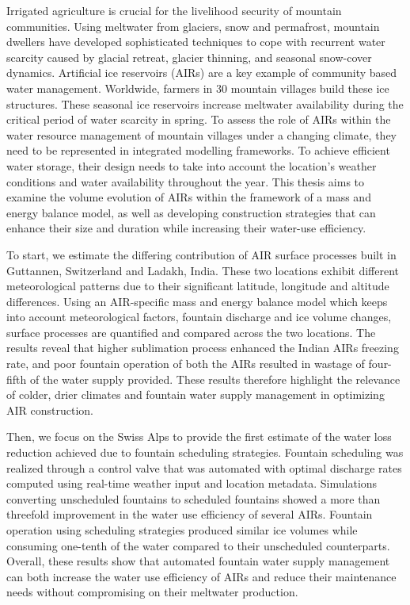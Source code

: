 %
\label{sec:abstract}

Irrigated agriculture is crucial for the livelihood security of mountain communities. Using meltwater from
glaciers, snow and permafrost, mountain dwellers have developed sophisticated techniques to cope with recurrent
water scarcity caused by glacial retreat, glacier thinning, and seasonal snow-cover dynamics. Artificial ice
reservoirs (AIRs) are a key example of community based water management. Worldwide, farmers in 30 mountain
villages build these ice structures. These seasonal ice reservoirs increase meltwater availability during the
critical period of water scarcity in spring. To assess the role of AIRs within the water resource management of
mountain villages under a changing climate, they need to be represented in integrated modelling frameworks. To
achieve efficient water storage, their design needs to take into account the location's weather conditions and
water availability throughout the year. This thesis aims to examine the volume evolution of AIRs within the
framework of a mass and energy balance model, as well as developing construction strategies that can enhance
their size and duration while increasing their water-use efficiency. 

To start, we estimate the differing contribution of AIR surface processes built in Guttannen, Switzerland and
Ladakh, India. These two locations exhibit different meteorological patterns due to their significant latitude,
longitude and altitude differences. Using an AIR-specific mass and energy balance model which keeps into account
meteorological factors, fountain discharge and ice volume changes, surface processes are quantified and compared
across the two locations. The results reveal that higher sublimation process enhanced the Indian AIRs freezing
rate, and poor fountain operation of both the AIRs resulted in wastage of four-fifth of the water supply
provided. These results therefore highlight the relevance of colder, drier climates and fountain water supply
management in optimizing AIR construction.  

Then, we focus on the Swiss Alps to provide the first estimate of the water loss reduction achieved due to
fountain scheduling strategies. Fountain scheduling was realized through a control valve that was automated with
optimal discharge rates computed using real-time weather input and location metadata. Simulations converting
unscheduled fountains to scheduled fountains showed a more than threefold improvement in the water use
efficiency of several AIRs. Fountain operation using scheduling strategies produced similar ice volumes while
consuming one-tenth of the water compared to their unscheduled counterparts.  Overall, these results show that
automated fountain water supply management can both increase the water use efficiency of AIRs and reduce their
maintenance needs without compromising on their meltwater production.


